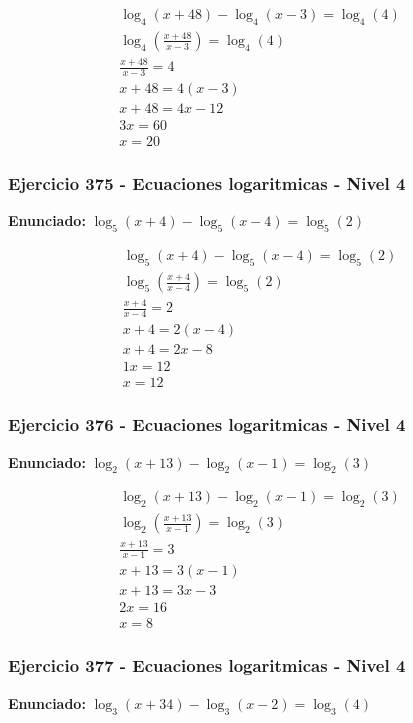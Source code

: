 \documentclass[12pt,a4paper]{article}
\begin{document}
\[
\begin{aligned}
\log_{4}\left(x+48\right) - \log_{4}\left(x-3\right)=\log_{4}\left(4\right)\\
\log_{4}\left(\frac{x+48}{x-3}\right)=\log_{4}\left(4\right)\\
\frac{x+48}{x-3}=4\\
x+48=4(x-3)\\
x+48=4x-12\\
3x=60\\
\boxed{x=20}
\end{aligned}
\]


\subsubsection*{Ejercicio 375 - Ecuaciones logaritmicas - Nivel 4}
\textbf{Enunciado:} \(\log_{5}\left(x+4\right) - \log_{5}\left(x-4\right)=\log_{5}\left(2\right)\)

\[
\begin{aligned}
\log_{5}\left(x+4\right) - \log_{5}\left(x-4\right)=\log_{5}\left(2\right)\\
\log_{5}\left(\frac{x+4}{x-4}\right)=\log_{5}\left(2\right)\\
\frac{x+4}{x-4}=2\\
x+4=2(x-4)\\
x+4=2x-8\\
1x=12\\
\boxed{x=12}
\end{aligned}
\]


\subsubsection*{Ejercicio 376 - Ecuaciones logaritmicas - Nivel 4}
\textbf{Enunciado:} \(\log_{2}\left(x+13\right) - \log_{2}\left(x-1\right)=\log_{2}\left(3\right)\)

\[
\begin{aligned}
\log_{2}\left(x+13\right) - \log_{2}\left(x-1\right)=\log_{2}\left(3\right)\\
\log_{2}\left(\frac{x+13}{x-1}\right)=\log_{2}\left(3\right)\\
\frac{x+13}{x-1}=3\\
x+13=3(x-1)\\
x+13=3x-3\\
2x=16\\
\boxed{x=8}
\end{aligned}
\]


\subsubsection*{Ejercicio 377 - Ecuaciones logaritmicas - Nivel 4}
\textbf{Enunciado:} \(\log_{3}\left(x+34\right) - \log_{3}\left(x-2\right)=\log_{3}\left(4\right)\)
\end{document}
